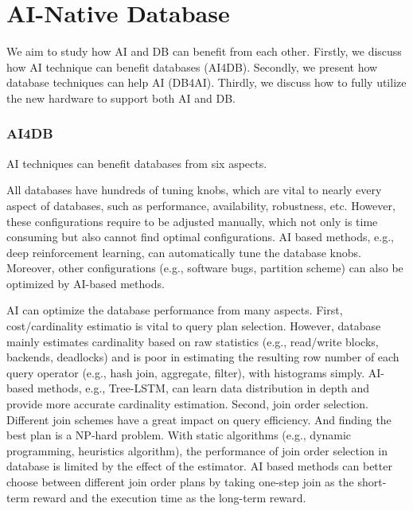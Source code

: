 
 
\section{AI-Native Database}
\label{sec:ANDB}
 
 

We aim to study how AI and DB can benefit from each other. Firstly, we discuss how AI technique can benefit databases (AI4DB). Secondly, we present how database techniques can help AI (DB4AI). Thirdly, we discuss how to fully utilize the new hardware to support both AI and DB. 


\subsubsection{AI4DB}
AI techniques can benefit databases from six aspects.

 All databases have hundreds of tuning knobs, which are vital to nearly every aspect of databases, such as performance, availability, robustness, etc. However, these configurations require to be adjusted manually, which not only is time consuming but also cannot find optimal configurations. AI based methods, e.g., deep reinforcement learning, can automatically tune the database knobs. Moreover, other configurations (e.g., software bugs, partition scheme) can also be optimized by AI-based methods. 


 AI can optimize the database performance from many aspects. First, cost/cardinality estimatio is vital to query plan selection. However, database mainly estimates cardinality based on raw statistics (e.g., read/write blocks, backends, deadlocks) and is poor in estimating the resulting row number of each query operator (e.g., hash join, aggregate, filter), with histograms simply. AI-based methods, e.g., Tree-LSTM, can learn data distribution in depth and provide more accurate cardinality estimation. Second, join order selection. Different join schemes have a great impact on query efficiency. And finding the best plan is a NP-hard problem. With static algorithms (e.g., dynamic programming, heuristics algorithm), the performance of join order selection in database is limited by the effect of the estimator. AI based methods can better choose between different join order plans by taking one-step join as the short-term reward and the execution time as the long-term reward. 

